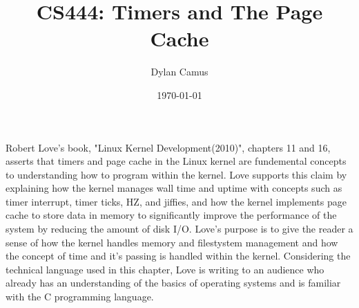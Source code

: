 \documentclass[letterpaper,10pt]{article}
\title{CS444: Timers and The Page Cache}
\author{Dylan Camus}
\date{\today}
\begin{document}
\maketitle
Robert Love's book, "Linux Kernel Development(2010)", chapters 11 and 16, asserts that timers and page cache in the Linux kernel are fundemental concepts to understanding how to program within the kernel. Love supports this claim by explaining how the kernel manages wall time and uptime with concepts such as timer interrupt, timer ticks, HZ, and jiffies, and how the kernel implements page cache to store data in memory to significantly improve the performance of the system by reducing the amount of disk I/O. Love's purpose is to give the reader a sense of how the kernel handles memory and filestystem management and how the concept of time and it's passing is handled within the kernel. Considering the technical language used in this chapter, Love is writing to an audience who already has an understanding of the basics of operating systems and is familiar with the C programming language.
\end{document}
